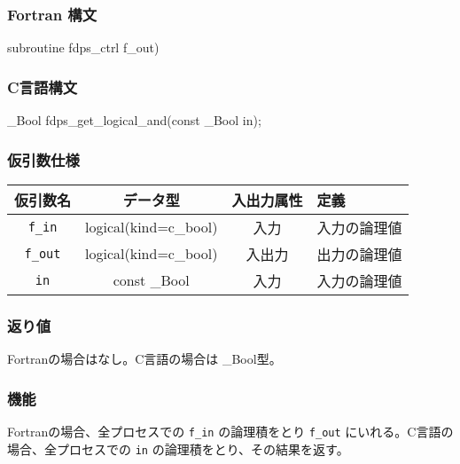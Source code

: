 \subsubsection*{Fortran 構文}
\begin{screen}
\begin{spverbatim}
subroutine fdps_ctrl%
                                     f_out)
\end{spverbatim}
\end{screen}

\subsubsection*{C言語構文}
\begin{screen}
\begin{spverbatim}
_Bool fdps_get_logical_and(const _Bool in);
\end{spverbatim}
\end{screen}

\subsubsection*{仮引数仕様}
\begin{table}[h]
\begin{tabularx}{\linewidth}{cccX}
\toprule
\rowcolor{Snow2}
仮引数名 & データ型 & 入出力属性 & 定義 \\
\midrule
\verb|f_in| & logical(kind=c\_bool) & 入力 & 入力の論理値\\
\verb|f_out| & logical(kind=c\_bool) & 入出力 & 出力の論理値\\
\verb|in| & const \_Bool & 入力 & 入力の論理値\\
\bottomrule
\end{tabularx}
\end{table}

\subsubsection*{返り値}
Fortranの場合はなし。C言語の場合は \_Bool型。

\subsubsection*{機能}
Fortranの場合、全プロセスでの \texttt{f\_in} の論理積をとり \texttt{f\_out} にいれる。C言語の場合、全プロセスでの \texttt{in} の論理積をとり、その結果を返す。
\clearpage

